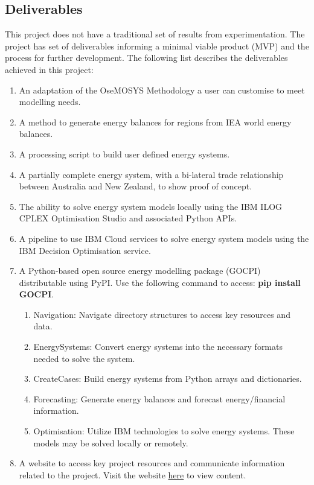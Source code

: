 \documentclass[12pt]{article}
\begin{document}
\subsection{Deliverables}
This project does not have a traditional set of results from experimentation. The project has set of deliverables informing a minimal viable product (MVP) and the process for further development.
The following list describes the deliverables achieved in this project:
\begin{enumerate}
	\item An adaptation of the OseMOSYS Methodology a user can customise to meet modelling needs.
	\item A method to generate energy balances for regions from IEA world energy balances.
	\item A processing script to build user defined energy systems.
	\item A partially complete energy system, with a bi-lateral trade relationship between Australia and New Zealand, to show proof of concept.
	\item The ability to solve energy system models locally using the IBM ILOG CPLEX Optimisation Studio and associated Python APIs.
	\item A pipeline to use IBM Cloud services to solve energy system models using the IBM Decision Optimisation service.
	\item A Python-based open source energy modelling package (GOCPI) distributable using PyPI. Use the following command to access: \textbf{pip install GOCPI}.
	\begin{enumerate}
		\item Navigation: Navigate directory structures to access key resources and data.
		\item EnergySystems: Convert energy systems into the necessary formats needed to solve the system.
		\item CreateCases: Build energy systems from Python arrays and dictionaries.
		\item Forecasting: Generate energy balances and forecast energy/financial information.
		\item Optimisation: Utilize IBM technologies to solve energy systems. These models may be solved locally or remotely.
	\end{enumerate}
		\item A website to access key project resources and communicate information related to the project.
		Visit the website \href{https://connormcdowall.com/gocpi.html}{here} to view content.
\end{enumerate}
\end{document}
